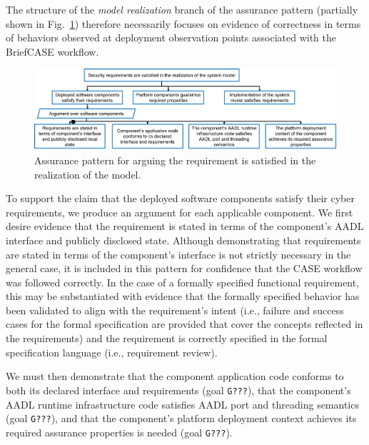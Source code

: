 The structure of the \textit{model realization} branch of the assurance pattern (partially shown in Fig.~\ref{fig:req-satisfied-in-model-realization}) therefore necessarily focuses on evidence of correctness in terms of behaviors observed at deployment observation points associated with the BriefCASE workflow. 

\begin{figure}[h] 
	\centering 
	\includegraphics[width=\textwidth]{figs/req-satisfied-in-model-realization.png}
	\caption{Assurance pattern for arguing the requirement is satisfied in the realization of the model.}
	\label{fig:req-satisfied-in-model-realization} 
\end{figure}

To support the claim that the deployed software components satisfy their cyber requirements, we produce an argument for each applicable component.
We first desire evidence that the requirement is stated in terms of the component's AADL interface and publicly disclosed state. 
Although demonstrating that requirements are stated in terms of the component's interface is not strictly necessary in the general case, it is included in this pattern for confidence that the CASE workflow was followed correctly.  In the case of a formally specified functional requirement, this may be substantiated with evidence that the formally specified behavior has been validated to align with the requirement's intent (i.e., failure and success cases for the formal specification are provided that cover the concepts reflected in the requirements) and the requirement is correctly specified in the formal specification language (i.e., requirement review).

We must then demonstrate that the component application code conforms to both its declared interface and requirements (goal \texttt{G???}), that the component's AADL runtime infrastructure code satisfies AADL port and threading semantics (goal \texttt{G???}), and that the component's platform deployment context achieves its required assurance properties is needed (goal \texttt{G???}).  

